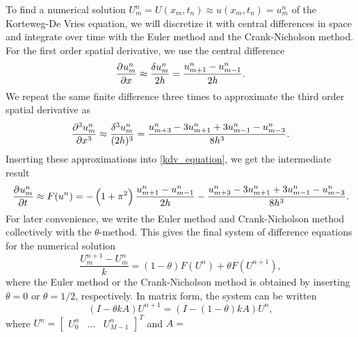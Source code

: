 \iffalse
\begin{equation*}
	\dpd{u}{t} = F\left(\dpd{u}{x}, \dpd[3]{u}{x}\right), \qquad \text{where} \,\, F\left(\dpd{u}{x}, \dpd[3]{u}{x}\right) = -\left(1+\pi^2\right) \dpd{u}{x} - \dpd[3]{u}{x}
\end{equation*}
\fi

To find a numerical solution $U_m^n = U(x_m, t_n) \approx u(x_m, t_n) = u_m^n$ of the Korteweg-De Vries equation, we will discretize it with central differences in space and integrate over time with the Euler method and the Crank-Nicholson method.
For the first order spatial derivative, we use the central difference
\begin{equation*}
	\dpd{u_m^n}{x}    \approx \frac{\delta u_m^n}{2 h}       = \frac{u_{m+1}^n-u_{m-1}^n}{2 h}.
\end{equation*}
We repeat the same finite difference three times to approximate the third order spatial derivative as 
\begin{equation*}
	\dpd[3]{u_m^n}{x} \approx \frac{\delta^3 u_m^n}{(2 h)^3} = \frac{u_{m+3}^n-3u_{m+1}^n+3u_{m-1}^n-u_{m-3}^n}{8 h^3}.
\end{equation*}
Inserting these approximations into \cref{kdv_equation}, we get the intermediate result
\begin{equation*}
	\dpd{u_m^n}{t} \approx F(u^n) = -\left(1+\pi^2\right) \frac{u_{m+1}^n-u_{m-1}^n}{2 h} - \frac{u_{m+3}^n-3u_{m+1}^n+3u_{m-1}^n-u_{m-3}^n}{8 h^3}.
\end{equation*}
For later convenience, we write the Euler method and Crank-Nicholson method collectively with the $\theta$-method.
This gives the final system of difference equations for the numerical solution
\begin{equation}\label{theta_method_discretized}
	\frac{U_m^{n+1} - U_m^n}{k} = (1-\theta) F(U^n) + \theta F(U^{n+1}),
\end{equation}
where the Euler method or the Crank-Nicholson method is obtained by inserting $\theta = 0$ or $\theta = 1/2$, respectively.
In matrix form, the system can be written
\begin{equation}
	\left(I - \theta k A\right) U^{n+1} = \left(I - \left(1-\theta\right) k A\right) U^n,
	\label{matrixeq}
\end{equation}
where $U^{n} = \begin{bmatrix} U_0^n & \dots & U_{M-1}^n \end{bmatrix}^T$ and $A = $
\newcommand\ca{\color{red}}
\newcommand\cb{\color{magenta}}
\newcommand\cc{\color{blue}}
\newcommand\cd{\color{cyan}}
